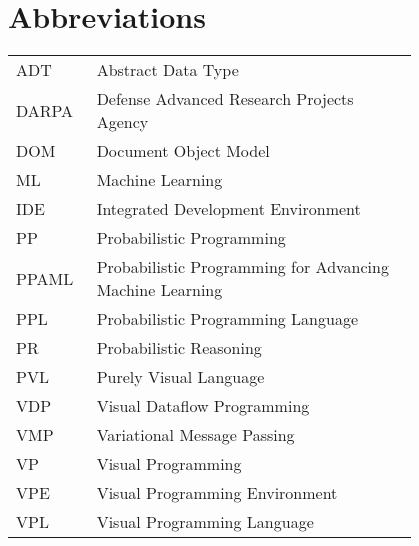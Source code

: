 \chapter*{Abbreviations}

\begin{flushleft}
\begin{tabular}{l p{0.8\linewidth}}
ADT      & Abstract Data Type\\
DARPA    & Defense Advanced Research Projects Agency\\
DOM      & Document Object Model\\
ML       & Machine Learning\\
IDE      & Integrated Development Environment\\
PP       & Probabilistic Programming\\
PPAML    & Probabilistic Programming for Advancing Machine Learning\\
PPL      & Probabilistic Programming Language\\
PR       & Probabilistic Reasoning\\
PVL      & Purely Visual Language\\
VDP      & Visual Dataflow Programming\\
VMP      & Variational Message Passing\\
VP       & Visual Programming\\
VPE      & Visual Programming Environment\\
VPL      & Visual Programming Language
\end{tabular}
\end{flushleft}
